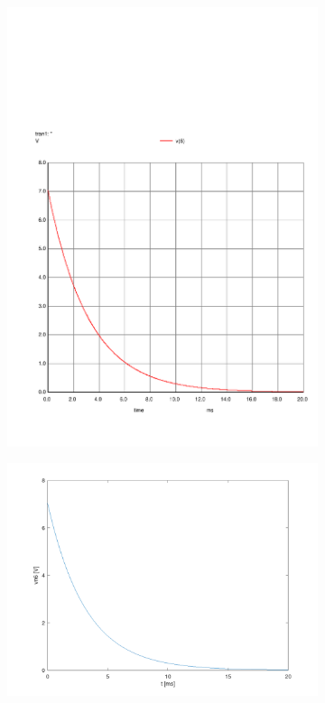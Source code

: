\begin{figure}[h]
  \centering
  \begin{subfigure}{0.23\textwidth}
    \includegraphics[width=\linewidth, clip]{../sim/trans.pdf}
    \label{fig:PStime}
  \end{subfigure}
  \begin{subfigure}{0.23\textwidth}
    \includegraphics[width=\linewidth, clip]{../mat/v6natural.png}
    \label{fig:PSciclo}
  \end{subfigure}


\end{figure}
